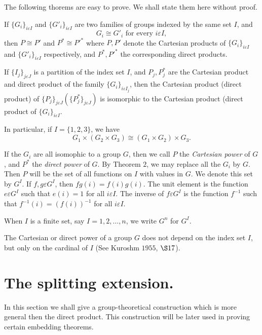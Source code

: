 The following thorems are easy to prove. We shall state them here
without proof. 

\begin{Theorem} %
  If $\{ G_i\}_{i \varepsilon I}$ and $\{G'_i\}_{i \varepsilon I}$ are
  two families of groups indexed by the same set $I$, and  
  $$
  G_i \cong G'_i \text{ for every } i \varepsilon I,
  $$
  then $P \cong P'$ and $P^* \cong P'^*$ where $P, P'$ denote the
  Cartesian products of $\{G_i\}_{i \varepsilon I}$ and $\{ G'_i\}_{i
    \varepsilon I}$ respectively, and $P^*, P'^*$ the corresponding
  direct products. 
\end{Theorem}

\begin{Theorem} %
  If $\{ I_j \}_{j \varepsilon J}$ is a partition of the index set
  $I$, and $P_j, P^*_j$ are the Cartesian product and direct product
  of the family  $\{G_i \}_{i \varepsilon I_j}$, then the Cartesian
  product (direct product) of  $\{ P_j\}_{j \varepsilon J} (\{
  P^*_j\}_{j \varepsilon J})$ is isomorphic to the Cartesian product
  (direct product of  $\{ G_i\}_{i \varepsilon I}$.  
\end{Theorem}

In particular, if $I= \{ 1, 2, 3 \}$, we have
$$
G_1 \times (G_2 \times G_3) \cong (G_1 \times G_2) \times G_3. 
$$

If the $G_i$ are all isomophic to  a group $G$, then we call $P$ the
\textit{ Cartesian power} of $G$, and $P^*$ the \textit{direct power}
of $G$. By Theorem $2$, we may replace all the $G_i$ by $G$. Then $P$
will be the set of all functions on $I$ with values in $G$. We denote
this set by $G^I$. If $f, g \varepsilon G^I$, then $fg(i)= f(i)
g(i)$. The unit element is the function $e \varepsilon G^I$ such that
$e(i) =1$ for all $i \varepsilon I$. The inverse of $f \varepsilon
G^I$ is the function $f^{-1}$ such that $f^{-1}(i) =(f(i))^{-1}$ for
all $i \varepsilon I$. 

When $I$ is a finite set, say $I= 1, 2, \ldots,  n$, we write $G^n$ for $G^I$.

The Cartesian or direct power of a group $G$ does not depend on the
index set $I$, but only on the cardinal of $I$ (See Kuroshm  $1955$,
$\S 17$). 

\section{The splitting extension.}%

In this section we shall give a group-theoretical construction which
is more general then the direct product. This construction will be
later used in proving certain embedding theorems. 

